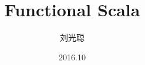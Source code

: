 
\title[Functional Scala]
{Functional Scala}

\subtitle{}

\author[Horance Liu] %
{ 刘光聪%
}

\institute[] %
{
}

\date[2016-10-15]{2016.10}
